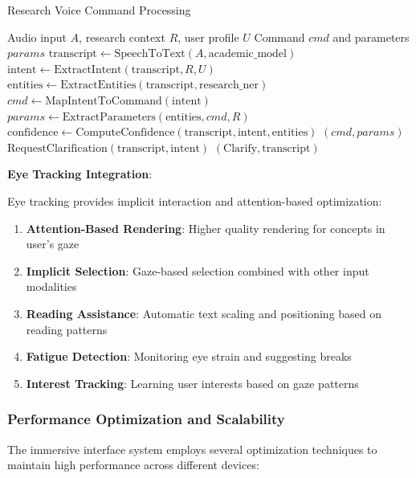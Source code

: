 \documentclass[10pt,twocolumn]{article}
\begin{document}
\begin{algorithm}[H]
\caption{Research Voice Command Processing}
\label{alg:voice_commands}
\begin{algorithmic}[1]
\REQUIRE Audio input $A$, research context $R$, user profile $U$
\ENSURE Command $cmd$ and parameters $params$
\STATE $\text{transcript} \leftarrow \text{SpeechToText}(A, \text{academic\_model})$
\STATE $\text{intent} \leftarrow \text{ExtractIntent}(\text{transcript}, R, U)$
\STATE $\text{entities} \leftarrow \text{ExtractEntities}(\text{transcript}, \text{research\_ner})$
\STATE $cmd \leftarrow \text{MapIntentToCommand}(\text{intent})$
\STATE $params \leftarrow \text{ExtractParameters}(\text{entities}, cmd, R)$
\STATE $\text{confidence} \leftarrow \text{ComputeConfidence}(\text{transcript}, \text{intent}, \text{entities})$
    \RETURN $(cmd, params)$
\ELSE
    \STATE $\text{RequestClarification}(\text{transcript}, \text{intent})$
    \RETURN $(\text{Clarify}, \text{transcript})$
\ENDIF
\end{algorithmic}
\end{algorithm}

\textbf{Eye Tracking Integration}:

Eye tracking provides implicit interaction and attention-based optimization:

\begin{enumerate}
    \item \textbf{Attention-Based Rendering}: Higher quality rendering for concepts in user's gaze
    \item \textbf{Implicit Selection}: Gaze-based selection combined with other input modalities
    \item \textbf{Reading Assistance}: Automatic text scaling and positioning based on reading patterns
    \item \textbf{Fatigue Detection}: Monitoring eye strain and suggesting breaks
    \item \textbf{Interest Tracking}: Learning user interests based on gaze patterns
\end{enumerate}

\subsubsection{Performance Optimization and Scalability}

The immersive interface system employs several optimization techniques to maintain high performance across different devices:
\end{document}
